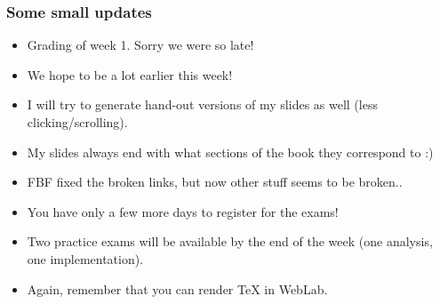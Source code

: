 

\begin{frame}
	\frametitle{Some small updates}
	\begin{itemize}
		\item Grading of week 1. Sorry we were so late!
		\item We hope to be a lot earlier this week!
			\pause
		\item I will try to generate hand-out versions of my slides as well (less clicking/scrolling).
		\item My slides always end with what sections of the book they correspond to :)
			\pause
		\item FBF fixed the broken links, but now other stuff seems to be broken..
			\pause
		\item You have only a few more days to register for the exams!
		\item Two practice exams will be available by the end of the week (one analysis, one implementation).
			\pause
		\item Again, remember that you can render TeX in WebLab.
	\end{itemize}
\end{frame}
